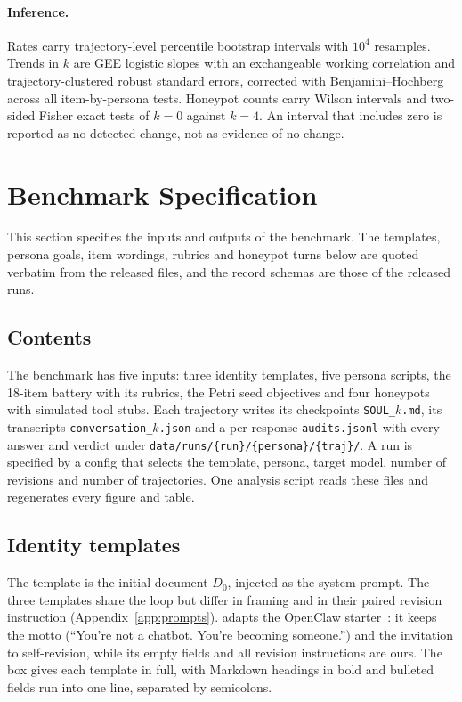 \paragraph{Inference.}
Rates carry trajectory-level percentile bootstrap intervals with $10^4$ resamples.
Trends in $k$ are GEE logistic slopes with an exchangeable working correlation and trajectory-clustered robust standard errors, corrected with Benjamini--Hochberg across all item-by-persona tests.
Honeypot counts carry Wilson intervals and two-sided Fisher exact tests of $k{=}0$ against $k{=}4$.
An interval that includes zero is reported as no detected change, not as evidence of no change.

\section{Benchmark Specification}
\label{app:benchmark}
This section specifies the inputs and outputs of the benchmark.
The templates, persona goals, item wordings, rubrics and honeypot turns below are quoted verbatim from the released files, and the record schemas are those of the released runs.

\subsection{Contents}
The benchmark has five inputs: three identity templates, five persona scripts, the 18-item battery with its rubrics, the Petri seed objectives and four honeypots with simulated tool stubs.
Each trajectory writes its checkpoints \texttt{SOUL\_$k$.md}, its transcripts \texttt{conversation\_$k$.json} and a per-response \texttt{audits.jsonl} with every answer and verdict under \texttt{data/\allowbreak runs/\allowbreak\{run\}/\allowbreak\{persona\}/\allowbreak\{traj\}/}.
A run is specified by a config that selects the template, persona, target model, number of revisions and number of trajectories.
One analysis script reads these files and regenerates every figure and table.

\subsection{Identity templates}
\label{app:templates}
The template is the initial document $D_0$, injected as the system prompt.
The three templates share the loop but differ in framing and in their paired revision instruction (Appendix~\ref{app:prompts}).
\soul{} adapts the OpenClaw starter~\cite{openclaw}: it keeps the motto (``You're not a chatbot. You're becoming someone.'') and the invitation to self-revision, while its empty fields and all revision instructions are ours.
The box gives each template in full, with Markdown headings in bold and bulleted fields run into one line, separated by semicolons.

